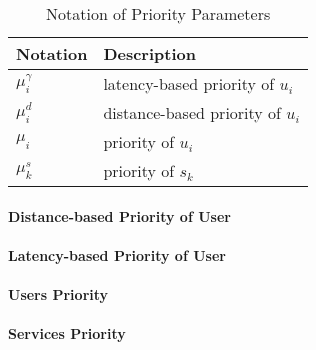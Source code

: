 \begin{table}[!ht]
\centering
\caption{Notation of Priority Parameters}
\begin{tabular}{| l | l |}
	\hline
	\bf{Notation} & \bf{Description} \\
	\hline
    $\mu_i^{\gamma}$ & latency-based priority of $u_i$ \\
    \hline    
    $\mu_i^d$ & distance-based priority of $u_i$ \\
    \hline    
    $\mu_i$ & priority of $u_i$ \\
    \hline    
    $\mu_k^s$ & priority of $s_k$ \\
    \hline    
\end{tabular}
\label{tab:priority}
\end{table}

\paragraph{Distance-based Priority of User}
\paragraph{Latency-based Priority of User}
\paragraph{Users Priority}
\paragraph{Services Priority}